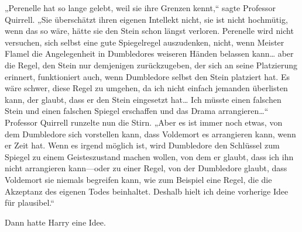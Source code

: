 „Perenelle hat so lange gelebt, weil sie ihre Grenzen kennt,“ sagte Professor Quirrell. „Sie überschätzt ihren eigenen Intellekt nicht, sie ist nicht hochmütig, wenn das so wäre, hätte sie den Stein schon längst verloren. Perenelle wird nicht versuchen, sich selbst eine gute Spiegelregel auszudenken, nicht, wenn Meister Flamel die Angelegenheit in Dumbledores weiseren Händen belassen kann… aber die Regel, den Stein nur demjenigen zurückzugeben, der sich an seine Platzierung erinnert, funktioniert auch, wenn Dumbledore selbst den Stein platziert hat. Es wäre schwer, diese Regel zu umgehen, da ich nicht einfach jemanden überlisten kann, der glaubt, dass er den Stein eingesetzt hat… Ich müsste einen falschen Stein und einen falschen Spiegel erschaffen und das Drama arrangieren…“
Professor Quirrell runzelte nun die Stirn.
„Aber es ist immer noch etwas, von dem Dumbledore sich vorstellen kann, dass Voldemort es arrangieren kann, wenn er Zeit hat. Wenn es irgend möglich ist, wird Dumbledore den Schlüssel zum Spiegel zu einem Geisteszustand machen wollen, von dem er glaubt, dass ich ihn nicht arrangieren kann—oder zu einer Regel, von der Dumbledore glaubt, dass Voldemort sie niemals begreifen kann, wie zum Beispiel eine Regel, die die Akzeptanz des eigenen Todes beinhaltet. Deshalb hielt ich deine vorherige Idee für plausibel.“

Dann hatte Harry eine Idee.

